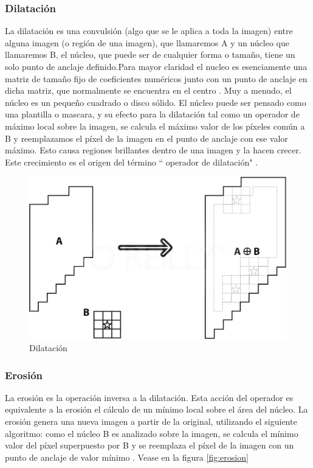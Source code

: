 \subsubsection{Dilatación}
La dilatación es una convulsión (algo que se le aplica a toda la imagen) entre alguna imagen (o región de una imagen), que llamaremos A y un núcleo que llamaremos B, el núcleo, que puede ser de cualquier forma o tamaño, tiene un solo punto de anclaje definido.Para mayor claridad el nucleo es esenciamente una matriz de tamaño fijo  de coeficientes numéricos junto con un punto de anclaje en dicha matriz, que normalmente se encuentra en el centro . Muy  a menudo, el núcleo es un pequeño cuadrado o disco sólido. El núcleo puede ser pensado como una plantilla  o mascara, y su efecto para la dilatación tal como un operador de máximo local sobre la imagen, se calcula el m\'aximo valor de los píxeles común a B y reemplazamos el píxel de la imagen en el punto de anclaje con ese valor máximo. Esto causa regiones brillantes dentro de una imagen y la hacen crecer. Este crecimiento es el origen del término `` operador de dilatación" \cite{BookOpenCv}. 

\begin{figure}[hbtp]

\centering
\includegraphics[scale=0.2]{imagenes/erosion-model.png}
\caption{Dilatación}
\end{figure}

\subsubsection{Erosión}
La erosión es la operación inversa a la dilatación. Esta acción del operador es equivalente a la erosión el cálculo de un mínimo local sobre el área del núcleo. La erosión genera una nueva imagen a partir de la original, utilizando el siguiente algoritmo: como el núcleo B es analizado sobre la imagen, se calcula el mínimo valor del píxel superpuesto por B y se reemplaza el píxel de la imagen con un punto de anclaje de valor mínimo \cite{BookOpenCv}. 
Vease en la figura \ref{fig:erosion}

